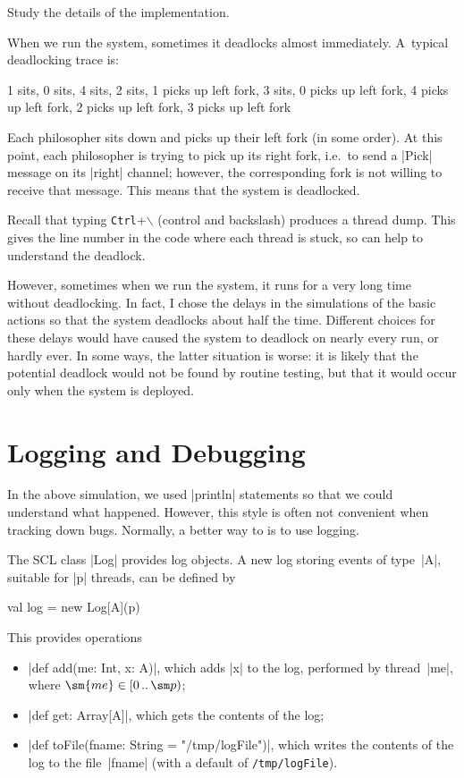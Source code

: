 \begin{instruction}
Study the details of the implementation.
\end{instruction}

When we run the system, sometimes it deadlocks almost immediately.  A~typical
deadlocking trace is:
%
\begin{scala}
1 sits,  0 sits,  4 sits,  2 sits,  1 picks up left fork, 3 sits,  0 picks up left fork,  
4 picks up left fork, 2 picks up left fork,  3 picks up left fork
\end{scala}
%
Each philosopher sits down and picks up their left fork (in some order).  At
this point, each philosopher is trying to pick up its right fork, i.e.~to send
a |Pick| message on its |right| channel; however, the corresponding fork is
not willing to receive that message.  This means that the system is
deadlocked.

Recall that typing \texttt{Ctrl}+$\backslash$ (control and backslash) produces
a thread dump.  This gives the line number in the code where each thread is
stuck, so can help to understand the deadlock.

However, sometimes when we run the system, it runs for a very long time
without deadlocking.  In fact, I chose the delays in the simulations of the
basic actions so that the system deadlocks about half the time.  Different
choices for these delays would have caused the system to deadlock on nearly
every run, or hardly ever.  In some ways, the latter situation is worse: it is
likely that the potential deadlock would not be found by routine testing, but
that it would occur only when the system is deployed.


\section{Logging and Debugging}

In the above simulation, we used |println| statements so that we could
understand what happened.  However, this style is often not convenient when
tracking down bugs.  Normally, a better way to is to use logging.

The SCL class |Log| provides log objects.
%
A new log storing events of type~|A|, suitable for |p| threads,
can be defined by
\begin{scala}
  val log = new Log[A](p)
\end{scala}
%
This provides operations
%
\begin{itemize}
\item |def add(me: Int, x: A)|, which adds |x| to the log, performed by
  thread~|me|, where $\sm{me} \in \interval{0}{\sm p}$;

\item |def get: Array[A]|, which gets the contents of the log;

\item |def toFile(fname: String = "/tmp/logFile")|, which writes the contents
  of the log to the file~|fname| (with a default of \texttt{/tmp/logFile}).
\end{itemize}

